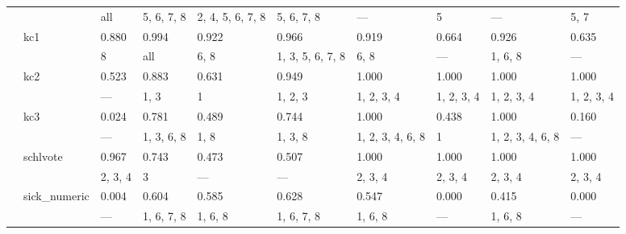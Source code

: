 \documentclass{article}
\begin{document}
\begin{center}
\begin{longtable}{p{1.2cm}p{1.8cm}p{1cm}p{1cm}p{1cm}p{1cm}p{1cm}p{1cm}p{1cm}p{1cm}}
             &              & all           & 5, 6, 7, 8       & 2, 4, 5, 6, 7, 8 & 5, 6, 7, 8       & ---              & 5                & ---              & 5, 7             \\
             & kc1          & 0.880         & 0.994            & 0.922            & 0.966            & 0.919            & 0.664            & 0.926            & 0.635            \\
             &              & 8             & all              & 6, 8             & 1, 3, 5, 6, 7, 8 & 6, 8             & ---              & 1, 6, 8          & ---              \\
             & kc2          & 0.523         & 0.883            & 0.631            & 0.949            & 1.000            & 1.000            & 1.000            & 1.000            \\
             &              & ---           & 1, 3             & 1                & 1, 2, 3          & 1, 2, 3, 4       & 1, 2, 3, 4       & 1, 2, 3, 4       & 1, 2, 3, 4       \\
             & kc3          & 0.024         & 0.781            & 0.489            & 0.744            & 1.000            & 0.438            & 1.000            & 0.160            \\
             &              & ---           & 1, 3, 6, 8       & 1, 8             & 1, 3, 8          & 1, 2, 3, 4, 6, 8 & 1                & 1, 2, 3, 4, 6, 8 & ---              \\
             & schlvote     & 0.967         & 0.743            & 0.473            & 0.507            & 1.000            & 1.000            & 1.000            & 1.000            \\
             &              & 2, 3, 4       & 3                & ---              & ---              & 2, 3, 4          & 2, 3, 4          & 2, 3, 4          & 2, 3, 4          \\
             & sick\_numeric & 0.004         & 0.604            & 0.585            & 0.628            & 0.547            & 0.000            & 0.415            & 0.000            \\
             &              & ---           & 1, 6, 7, 8       & 1, 6, 8          & 1, 6, 7, 8       & 1, 6, 8          & ---              & 1, 6, 8          & ---              \\
\hline
\end{longtable}
\end{center}
\end{document}

